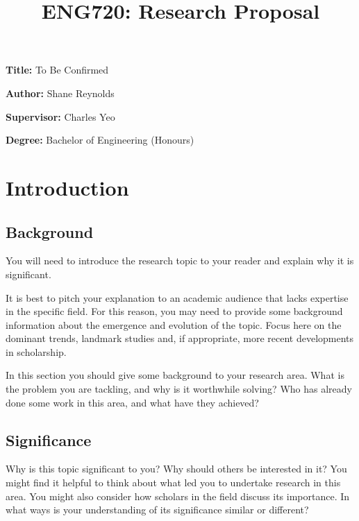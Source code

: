 \documentclass[12pt, a4paper]{article}
\title{ENG720: Research Proposal}
\author{}
\date{}
\newcommand{\namelistlabel}[1]{\mbox{#1}\hfil}
\newenvironment{namelist}[1]{%
\begin{list}{}
    {
        \let\makelabel\namelistlabel
        \settowidth{\labelwidth}{#1}
        \setlength{\leftmargin}{1.1\labelwidth}
    }
  }{%
\end{list}}
\begin{document}
\maketitle

\begin{namelist}{xxxxxxxxxxxx}
\item[{\bf Title:}]
	To Be Confirmed
\item[{\bf Author:}]
	Shane Reynolds
\item[{\bf Supervisor:}]
	Charles Yeo
\item[{\bf Degree:}]
	Bachelor of Engineering (Honours)
\end{namelist}

\section{Introduction}

\subsection{Background}
You will need to introduce the research topic to your reader and explain why it is significant.

It is best to pitch your explanation to an academic audience that lacks expertise in the specific field. For this reason, you may need to provide some background information about the emergence and evolution of the topic. Focus here on the dominant trends, landmark studies and, if appropriate, more recent developments in scholarship.

In this section you should give some background to your
research area. What is the problem you are tackling, and why is it
worthwhile solving? Who has already done some work in this area,
and what have they achieved?

\subsection{Significance}
Why is this topic significant to you? Why should others be interested in it? You might find it helpful to think about what led you to undertake research in this area. You might also consider how scholars in the field discuss its importance. In what ways is your understanding of its significance similar or different?


\end{document}
